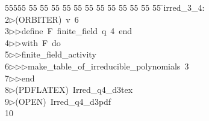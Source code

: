 %
%
\begin{tabbing}
55555 \= 55 \= 55 \= 55 \= 55 \= 55 \= 55 \= 55 \= 55 \= 55 \= 55 \= 55 \= 55 \= \>irred\_3\_4:\\[0pt]
2\>$\triangleright$\>(ORBITER)\ v\ 6\ \\[0pt]
3\>$\triangleright$\>$\triangleright$\>define\ F\ finite\_field\ q\ 4\ end\ \\[0pt]
4\>$\triangleright$\>$\triangleright$\>with\ F\ do\ \\[0pt]
5\>$\triangleright$\>$\triangleright$\>finite\_field\_activity\ \\[0pt]
6\>$\triangleright$\>$\triangleright$\>$\triangleright$\>make\_table\_of\_irreducible\_polynomials\ 3\ \\[0pt]
7\>$\triangleright$\>$\triangleright$\>end\\[0pt]
8\>$\triangleright$\>(PDFLATEX)\ Irred\_q4\_d3tex\\[0pt]
9\>$\triangleright$\>(OPEN)\ Irred\_q4\_d3pdf\\[0pt]
10\>\end{tabbing}
